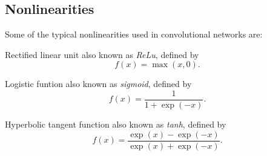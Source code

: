 \documentclass[]{article}
\begin{document}
%
%
%
%
%
%
%
%

\subsection{Nonlinearities}
Some of the typical nonlinearities used in convolutional networks are:

Rectified linear unit also known as \emph{ReLu}, defined by
\[
f(x) = \max(x, 0).
\]

Logistic funtion also known as \emph{sigmoid}, defined by
\[
f(x) = \frac{1}{1 + \exp(-x)}.
\]

Hyperbolic tangent function also known as \emph{tanh}, defined by
\[
f(x) = \frac{\exp(x) - \exp(-x)}{\exp(x) + \exp(-x)}.
\]
\end{document}
